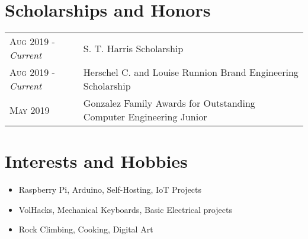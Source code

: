 \documentclass[a4paper,11pt]{article}
\begin{document}
\section{Scholarships and Honors}
\begin{tabularx}{\textwidth}{lX}
   \textsc{Aug 2019} \-- \emph{Current} & S. T. Harris Scholarship\\
   \textsc{Aug 2019} \-- \emph{Current} & Herschel C. and Louise Runnion Brand Engineering Scholarship\\
   \textsc{May 2019} & Gonzalez Family Awards for Outstanding Computer Engineering Junior\\
\end{tabularx}

\section{Interests and Hobbies}
\begin{itemize}[topsep=1pt,itemsep=0pt,partopsep=1pt, parsep=1pt]
   \item Raspberry Pi, Arduino, Self-Hosting, IoT Projects
   \item VolHacks, Mechanical Keyboards, Basic Electrical projects
   \item Rock Climbing, Cooking, Digital Art %
\end{itemize}
\end{document}
